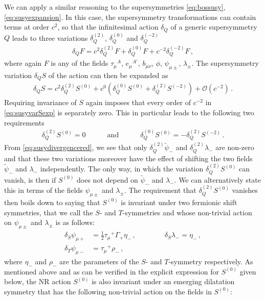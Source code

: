 \documentclass[a4paper,10pt,openany]{article}
\begin{document}
	We can apply a similar reasoning to the supersymmetries \eqref{eq:bossusy}, \eqref{eq:susyexpansion}. In this case, the supersymmetry transformations can contain terms at order $c^2$, so that the infinitesimal action $\delta_Q$ of a generic supersymmetry $Q$ leads to three variations $\delta_Q^{(2)}$, $\delta_Q^{(0)}$ and $\delta_Q^{(-2)}$
	\begin{align}
		\delta_Q F = c^2 \delta_Q^{(2)} F + \delta_Q^{(0)} F + c^{-2} \delta_Q^{(-2)} F \,,
	\end{align}
	where again $F$ is any of the fields $\tau_\mu{}^A$, $e_\mu{}^{A'}$, $b_{\mu\nu}$, $\phi$, $\psi_{\mu\pm}$, $\lambda_\pm$. The supersymmetry variation $\delta_Q S$ of the action can then be expanded as
	\begin{align} \label{eq:susyvarSexp}
		\delta_Q S = c^2 \delta_Q^{(2)} S^{(0)} + c^0 \left( \delta_Q^{(0)} S^{(0)} + \delta_Q^{(2)} S^{(-2)} \right) + \mathcal{O}(c^{-2}) \,.
	\end{align}
	Requiring invariance of $S$ again imposes that every order of $c^{-2}$ in \eqref{eq:susyvarSexp} is separately zero. This in particular leads to the following two requirements
	\begin{align} \label{eq:deltaQconstraints}
		\delta_Q^{(2)} S^{(0)} = 0  \quad \qquad \text{and} \quad \qquad \delta_Q^{(0)} S^{(0)} = - \delta_Q^{(2)} S^{(-2)} \,.
	\end{align}
	From \eqref{eq:susydivergencered}, we see that only $\delta_Q^{(2)} \tilde\psi_{-}$ and $\delta_Q^{(2)} \lambda_-$ are non-zero and that these two variations moreover have the effect of shifting the two fields $\tilde\psi_{-}$ and $\lambda_-$ independently. The only way, in which the variation $\delta_Q^{(2)} S^{(0)}$ can vanish, is then if $S^{(0)}$ does not depend on $\tilde\psi_{-}$ and $\lambda_-$. We can alternatively state this in terms of the fields $\psi_{\mu\pm}$ and $\lambda_{\pm}$. The requirement that $\delta_Q^{(2)} S^{(0)}$ vanishes then boils down to saying that $S^{(0)}$ is invariant under two fermionic shift symmetries, that we call the $S$- and $T$-symmetries and whose non-trivial action on $\psi_{\mu\pm}$ and $\lambda_\pm$ is as follows:
	\begin{align}
		\label{eq:STsymm}
		\delta_S \psi_{\mu+} &= \frac12 \tau_\mu{}^+ \Gamma_+ \eta_- \,, \qquad \qquad \delta_S \lambda_- = \eta_- \,, \nonumber \\
		\delta_T \psi_{\mu-} &= \tau_\mu{}^+ \rho_- \,,
	\end{align}
	where $\eta_-$ and $\rho_-$ are the parameters of the $S$- and $T$-symmetry respectively. As mentioned above and as can be verified in the explicit expression for $S^{(0)}$ given below, the NR action $S^{(0)}$ is also invariant under an emerging dilatation symmetry that has the following non-trivial action on the fields in $S^{(0)}$:
\end{document}
